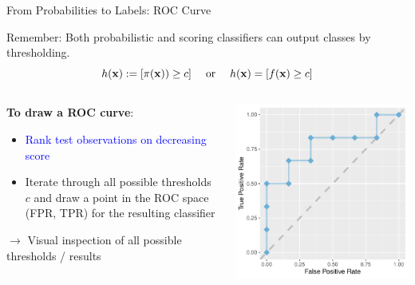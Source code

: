 \documentclass[11pt,compress,t,notes=noshow, xcolor=table]{beamer}
\newenvironment{knitrout}{}{} %
\begin{document}
\begin{vbframe}{From Probabilities to Labels: ROC Curve}

Remember: Both probabilistic and scoring classifiers can output classes by thresholding.\\
$$h(\mathbf{x}):= [\pi(\mathbf{x})) \ge c] \quad \text{ or } \quad h(\mathbf{x}) = [f(\mathbf{x}) \ge c]$$

\begin{columns}
\begin{column}{0.45\textwidth}

\textbf{To draw a ROC curve}:\\

\begin{itemize}
 \item \textcolor{blue}{Rank test observations on decreasing score}
  \item Iterate through all possible thresholds $c$ and draw a point in the ROC space (FPR, TPR) for the resulting classifier
\end{itemize}
\lz 




$\rightarrow$ Visual inspection of all possible thresholds / results

\end{column}
\begin{column}{0.45\textwidth} 

\begin{knitrout}\scriptsize
{}\color{fgcolor}

{\centering \includegraphics[width=\textwidth]{figure/eval_mclass_roc_sp_4}

}
\end{knitrout}
\end{column}
\end{columns}
\end{vbframe}
\end{document}

